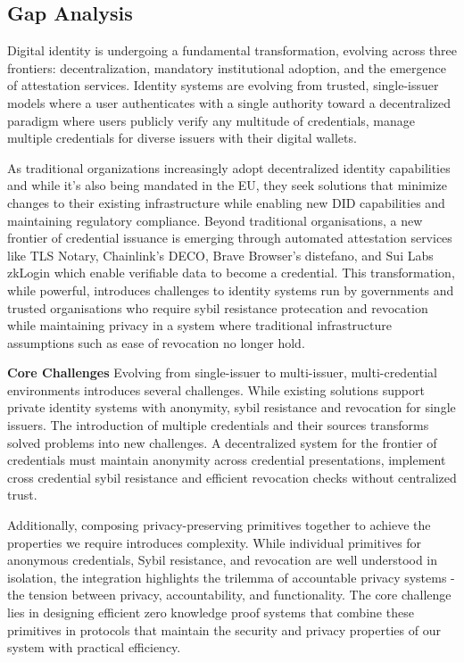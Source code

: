 \subsection{Gap Analysis}

Digital identity is undergoing a fundamental transformation, evolving across three frontiers: decentralization, mandatory institutional adoption, and the emergence of attestation services.    
Identity systems are evolving from trusted, single-issuer models where a user authenticates with a single authority toward a decentralized paradigm where users publicly verify any multitude of credentials, manage multiple credentials for diverse issuers with their digital wallets.

\noindent As traditional organizations increasingly adopt decentralized identity capabilities and while it's also being mandated in the EU, they seek solutions that minimize changes to their existing infrastructure while enabling new DID capabilities and maintaining regulatory compliance. Beyond traditional organisations, a new frontier of credential issuance is emerging through automated attestation services like TLS Notary, Chainlink's DECO, Brave Browser's distefano, and Sui Labs zkLogin which enable verifiable data to become a credential. This transformation, while powerful, introduces challenges to identity systems run by governments and trusted organisations  who require sybil resistance protecation and revocation while maintaining privacy in a system where traditional infrastructure assumptions such as ease of revocation no longer hold.

\noindent \textbf{Core Challenges} Evolving from single-issuer to multi-issuer, multi-credential environments introduces several challenges. While existing solutions support private identity systems with anonymity, sybil resistance and revocation for single issuers. The introduction of multiple credentials and their sources transforms solved problems into new challenges. A decentralized system for the frontier of credentials must maintain anonymity across credential presentations, implement cross credential sybil resistance and efficient revocation checks without centralized trust.

\noindent Additionally, composing privacy-preserving primitives together to achieve the properties we require introduces complexity. While individual primitives for anonymous credentials, Sybil resistance, and revocation are well understood in isolation, the integration highlights the trilemma of accountable privacy systems - the tension between privacy, accountability, and functionality. The core challenge lies in designing efficient zero knowledge proof systems that combine these primitives in protocols that maintain the security and privacy properties of our system with practical efficiency.


